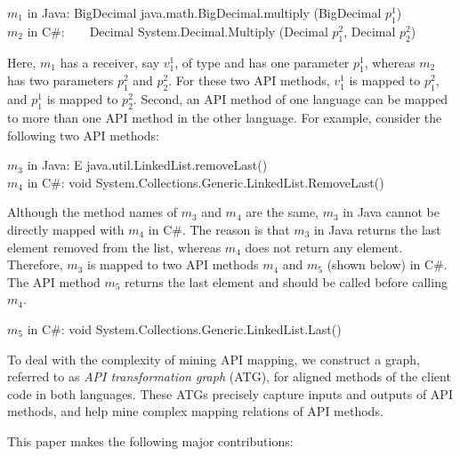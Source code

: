 \begin{CodeOut}
$m_1$ in Java: BigDecimal java.math.BigDecimal.multiply (BigDecimal $p_1^1$)\\
\hspace*{0.12in}$m_2$ in C\#:\ \ \ \  Decimal
System.Decimal.Multiply (Decimal $p_1^2$, Decimal $p_2^2$)
\end{CodeOut}

Here, $m_1$ has a receiver, say $v_1^1$, of type 
and has one parameter $p_1^1$, whereas $m_2$ has two parameters $p_1^2$
and $p_2^2$. For these two API methods, $v_1^1$ is
mapped to $p_1^2$, and $p_1^1$ is mapped to $p_2^2$. Second, an API
method of one language can be mapped to more than one API method in the
other language. For example, consider the following two API methods:

\begin{CodeOut}
$m_3$ in Java: E java.util.LinkedList.removeLast()\\
\hspace*{0.12in}$m_4$ in C\#: void System.Collections.Generic.LinkedList.RemoveLast()
\end{CodeOut}

Although the method names of $m_3$ and $m_4$ are the same, $m_3$ in Java
cannot be directly mapped with $m_4$ in C\#. The reason is that $m_3$ in Java
returns the last element removed from the list, whereas $m_4$ does not return any
element. Therefore, $m_3$ is mapped to two API methods $m_4$ and $m_5$ (shown below) in C\#.
The API method $m_5$ returns the last element and should be called before calling $m_4$.

\begin{CodeOut}
$m_5$ in C\#: void System.Collections.Generic.LinkedList.Last()
\end{CodeOut}

To deal with the complexity of mining API mapping, we construct a
graph, referred to as \emph{API transformation graph} (ATG), for
aligned methods of the client code in both languages. These ATGs
precisely capture inputs and outputs of API methods, and help mine
complex mapping relations of API methods. 

This paper makes the following major contributions:

